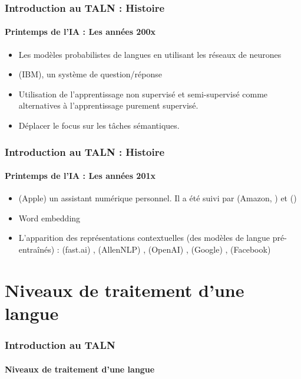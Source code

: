 \documentclass[xcolor=table]{beamer}
\begin{document}
\begin{frame}
\frametitle{Introduction au TALN : Histoire}
\framesubtitle{Printemps de l'IA : Les années 200x}

\begin{itemize}
	\item {} Les modèles probabilistes de langues en utilisant les réseaux de neurones \cite{2003-bengio-al}
	\item {}  (IBM), un système de question/réponse
	\item Utilisation de l'apprentissage non supervisé et semi-supervisé comme alternatives à l'apprentissage purement supervisé.
	\item Déplacer le focus sur les tâches sémantiques.
\end{itemize}

\end{frame}

\begin{frame}
\frametitle{Introduction au TALN : Histoire}
\framesubtitle{Printemps de l'IA : Les années 201x}

\begin{itemize}
	\item {}  (Apple)  un assistant numérique personnel. Il a été suivi par  (Amazon, ) et  ()
	\item {} Word embedding \cite{2014-lebret-collobert}
	\item {} L'apparition des représentations contextuelles (des modèles de langue pré-entraînés) :  (fast.ai) \cite{2018-howard-ruder},  (AllenNLP) \cite{2018-peters-al},  (OpenAI) \cite{2018-radford-al},  (Google) \cite{2018-devlin-al},  (Facebook) \cite{2019-lample-conneau}
\end{itemize}

\end{frame}

\section{Niveaux de traitement d'une langue}

\begin{frame}
\frametitle{Introduction au TALN}
\framesubtitle{Niveaux de traitement d'une langue}


\end{frame}
\end{document}
